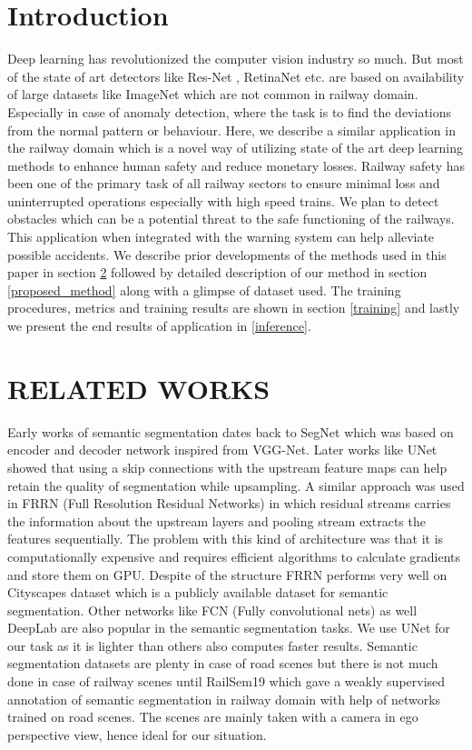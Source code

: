 \documentclass[conference]{IEEEtran}
\begin{document}
\section{Introduction}
Deep learning has revolutionized the computer vision industry so much. But most of the state of art detectors like Res-Net \cite{he2015deep}, RetinaNet \cite{lin2018focal} etc. are based on availability of large datasets like ImageNet \cite{5206848} which are not common in railway domain. Especially in case of anomaly detection, where the task is to find the deviations from the normal pattern or behaviour. Here, we describe a similar application in the railway domain which is a novel way of utilizing state of the art deep learning methods to enhance human safety and reduce monetary losses. Railway safety has been one of the primary task of all railway sectors to ensure minimal loss and uninterrupted operations especially with high speed trains. We plan to detect obstacles which can be a potential threat to the safe functioning of the railways. This application when integrated with the warning system can help alleviate possible accidents. We describe prior developments of the methods used in this paper in section \ref{related_works} followed by detailed description of our method in section \ref{proposed_method} along with a glimpse of dataset used. The training procedures, metrics and training results are shown in section \ref{training} and lastly we present the end results of application in \ref{inference}. 

\section{RELATED WORKS} \label{related_works}
Early works of semantic segmentation dates back to SegNet \cite{badrinarayanan2016segnet} which was based on encoder and decoder network inspired from VGG-Net\cite{simonyan2015deep}. Later works like UNet \cite{ronneberger2015unet} showed that using a skip connections with the upstream feature maps can help retain the quality of segmentation while upsampling. A similar approach was used in FRRN (Full Resolution Residual Networks) \cite{pohlen2016fullresolution} in which residual streams carries the information about the upstream layers and pooling stream extracts the features sequentially. The problem with this kind of architecture was that it is computationally expensive and requires efficient algorithms to calculate gradients and store them on GPU. Despite of the structure FRRN performs very well on Cityscapes \cite{cordts2016cityscapes} dataset which is a publicly available dataset for semantic segmentation. Other networks like FCN (Fully convolutional nets) \cite{long2015fully} as well DeepLab  \cite{chen2017deeplab} are also popular in the semantic segmentation tasks. We use UNet for our task as it is lighter than others also computes faster results. Semantic segmentation datasets are plenty in case of road scenes but there is not much done in case of railway scenes until RailSem19 \cite{9025646} which gave a weakly supervised annotation of semantic segmentation in railway domain with help of networks trained on road scenes. The scenes are mainly taken with a camera in ego perspective view, hence ideal for our situation. 
\end{document}
